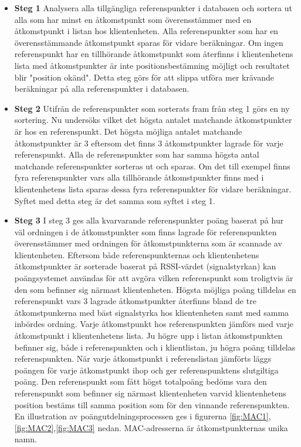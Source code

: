 \documentclass[swedish, a4paper,12pt]{article}
\begin{document}
  \begin{itemize}
    \item \textbf{Steg 1}
    \newline
    Analysera alla tillgängliga referenspunkter i databasen och sortera ut alla som har minst en åtkomstpunkt som överensstämmer med en åtkomstpunkt i listan hos klientenheten. Alla referenspunkter som har en överensstämmande åtkomstpunkt sparas för vidare beräkningar. Om ingen referenspunkt har en tillhörande åtkomstpunkt som återfinns i klientenhetens lista med åtkomstpunkter är inte positionsbestämning möjligt och resultatet blir "position okänd".
    Detta steg görs för att slippa utföra mer krävande beräkningar på alla referenspunkter i databasen.
    \item \textbf{Steg 2}
    \newline
    Utifrån de referenspunkter som sorterats fram från steg 1 görs en ny sortering. Nu undersöks vilket det högsta antalet matchande åtkomstpunkter är hos en referenspunkt. Det högsta möjliga antalet matchande åtkomstpunkter är 3 eftersom det finns 3 åtkomstpunkter lagrade för varje referenspunkt. Alla de referenspunkter som har samma högsta antal matchande referenspunkter sorteras ut och sparas.
    Om det till exempel finns fyra referenspunkter vars alla tillhörande åtkomstpunkter finns med i klientenhetens lista sparas dessa fyra referenspunkter för vidare beräkningar. Syftet med detta steg är det samma som syftet i steg 1.

    \item \textbf{Steg 3}
    \newline
    I steg 3 ges alla kvarvarande referenspunkter poäng baserat på hur väl ordningen i de åtkomstpunkter som finns lagrade för referenspunkten överensstämmer med ordningen för åtkomstpunkterna som är scannade av klientenheten. Eftersom både referenspunkternas och klientenhetens åtkomstpunkter är sorterade baserat på RSSI-värdet (signalstyrkan) kan poängsystemet användas för att avgöra vilken referenspunkt som troligtvis är den som befinner sig närmast klientenheten.
    Högsta möjliga poäng tilldelas en referenspunkt vars 3 lagrade åtkomstpunkter återfinns bland de tre åtkomstpunkerna med bäst signalstyrka hos klientenheten samt med samma inbördes ordning. Varje åtkomstpunkt hos referenspunkten jämförs med varje åtkomstpunkt i klientenhetens lista. Ju högre upp i listan åtkomstpunkten befinner sig, både i referenspunkten och i klientlistan, ju högra poäng tilldelas referenspunkten. När varje åtkomstpunkt i referenslistan jämförts läggs poängen för varje åtkomstpunkt ihop och ger referenspunktens slutgiltiga poäng.
    Den referenspunkt som fått högst totalpoäng bedöms vara den referenspunkt som befinner sig närmast klientenheten varvid klientenhetens position bestäms till samma position som för den vinnande referenspunkten.
    En illustration av poängutdelningsprocessen ges i figurerna \ref{fig:MAC1},\ref{fig:MAC2},\ref{fig:MAC3} nedan.
    MAC-adresserna är åtkomstpunkternas unika namn.


\end{itemize}
\end{document}
